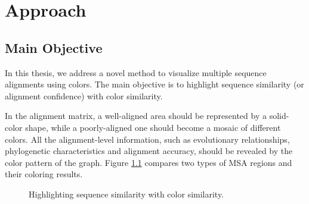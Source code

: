\chapter{Approach}\label{chap:Approach}

\section{Main Objective}

In this thesis, we address a novel method to visualize multiple sequence alignments using colors. The main objective is to highlight sequence similarity (or alignment confidence) with color similarity.

In the alignment matrix, a well-aligned area should be represented by a solid-color shape, while a poorly-aligned one should become a mosaic of different colors. All the alignment-level information, such as evolutionary relationships, phylogenetic characteristics and alignment accuracy, should be revealed by the color pattern of the graph. Figure \ref{fig:app-wa} compares two types of MSA regions and their coloring results.

\begin{figure}[hbt]
\centering
{}
\hspace{5mm}
\caption[Highlighting Sequence Similarity With Color Similarity]{Highlighting sequence similarity with color similarity.}\label{fig:app-wa}
\end{figure}

